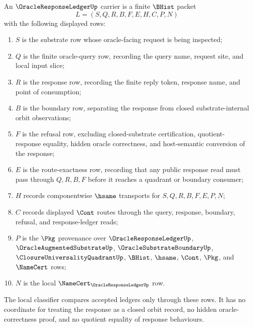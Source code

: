 \begin{definition}
\label{def:oracle-response-ledger-carrier}
An $\OracleResponseLedgerUp$ carrier is a finite $\BHist$ packet
$$
L=(S,Q,R,B,F,E,H,C,P,N)
$$
with the following displayed rows:
\begin{enumerate}
\item $S$ is the substrate row whose oracle-facing request is being inspected;
\item $Q$ is the finite oracle-query row, recording the query name, request
site, and local input slice;
\item $R$ is the response row, recording the finite reply token, response
name, and point of consumption;
\item $B$ is the boundary row, separating the response from closed
substrate-internal orbit observations;
\item $F$ is the refusal row, excluding closed-substrate certification,
quotient-response equality, hidden oracle correctness, and host-semantic
conversion of the response;
\item $E$ is the route-exactness row, recording that any public response read
must pass through $Q,R,B,F$ before it reaches a quadrant or boundary consumer;
\item $H$ records componentwise $\hsame$ transports for $S,Q,R,B,F,E,P,N$;
\item $C$ records displayed $\Cont$ routes through the query, response,
boundary, refusal, and response-ledger reads;
\item $P$ is the $\Pkg$ provenance over $\OracleResponseLedgerUp$,
$\OracleAugmentedSubstrateUp$, $\OracleSubstrateBoundaryUp$,
$\ClosureUniversalityQuadrantUp$, $\BHist$, $\hsame$, $\Cont$, $\Pkg$, and
$\NameCert$ rows;
\item $N$ is the local $\NameCert_{\OracleResponseLedgerUp}$ row.
\end{enumerate}
The local classifier compares accepted ledgers only through these rows. It has
no coordinate for treating the response as a closed orbit record, no hidden
oracle-correctness proof, and no quotient equality of response behaviours.
\end{definition}

